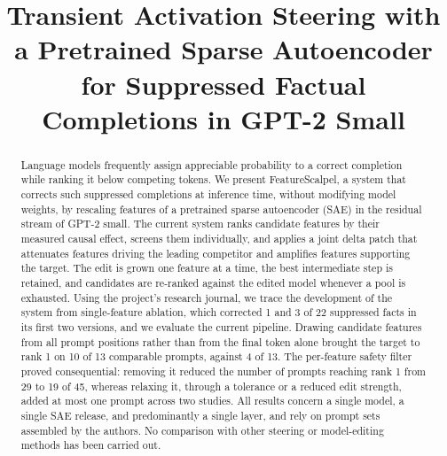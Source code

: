 \documentclass[conference]{IEEEtran}
\begin{document}
\title{Transient Activation Steering with a Pretrained Sparse Autoencoder for Suppressed Factual Completions in GPT-2 Small}

\author{
}

\maketitle


\begin{abstract}
Language models frequently assign appreciable probability to a correct completion while ranking it below competing tokens. We present FeatureScalpel, a system that corrects such suppressed completions at inference time, without modifying model weights, by rescaling features of a pretrained sparse autoencoder (SAE) in the residual stream of GPT-2 small. The current system ranks candidate features by their measured causal effect, screens them individually, and applies a joint delta patch that attenuates features driving the leading competitor and amplifies features supporting the target. The edit is grown one feature at a time, the best intermediate step is retained, and candidates are re-ranked against the edited model whenever a pool is exhausted. Using the project's research journal, we trace the development of the system from single-feature ablation, which corrected 1 and 3 of 22 suppressed facts in its first two versions, and we evaluate the current pipeline. Drawing candidate features from all prompt positions rather than from the final token alone brought the target to rank 1 on 10 of 13 comparable prompts, against 4 of 13. The per-feature safety filter proved consequential: removing it reduced the number of prompts reaching rank 1 from 29 to 19 of 45, whereas relaxing it, through a tolerance or a reduced edit strength, added at most one prompt across two studies. All results concern a single model, a single SAE release, and predominantly a single layer, and rely on prompt sets assembled by the authors. No comparison with other steering or model-editing methods has been carried out.
\end{abstract}
\end{document}
